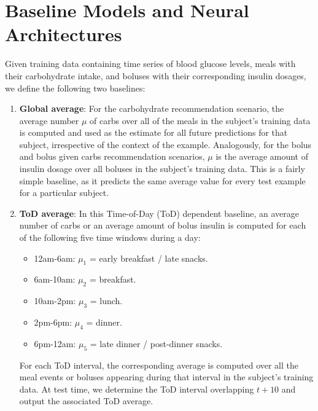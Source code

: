 \documentclass[journal,article,submit,moreauthors,pdftex]{Definitions/mdpi}
\begin{document}


\section{Baseline Models and Neural Architectures}
\label{sec:models}

Given training data containing time series of blood glucose levels, meals with their carbohydrate intake, and boluses with their corresponding insulin dosages, we define the following two baselines:
\begin{enumerate}
    \item {\bf Global average}: 
    For the carbohydrate recommendation scenario, the average number $\mu$ of carbs over all of the meals in the subject's training data is computed and used as the estimate for all future predictions for that subject, irrespective of the context of the example. Analogously, for the bolus and bolus given carbs recommendation scenarios, $\mu$ is the average amount of insulin dosage over all boluses in the subject's training data. This is a fairly simple baseline, as it predicts the same average value for every test example for a particular subject.
    
    \item {\bf ToD average}: In this Time-of-Day (ToD) dependent baseline, an average number of carbs or an average amount of bolus insulin is computed for each of the following five time windows during a day:
	\begin{itemize}
		\item 12am-6am: $\mu_1$ = early breakfast / late snacks.
		\item 6am-10am: $\mu_2$ = breakfast.
		\item 10am-2pm: $\mu_3$ = lunch.
		\item 2pm-6pm: $\mu_4$ = dinner.
		\item 6pm-12am: $\mu_5$ = late dinner / post-dinner snacks.
	\end{itemize}
	For each ToD interval, the corresponding average is computed over all the meal events or boluses appearing during that interval in the subject's training data. At test time, we determine the ToD interval overlapping $t+10$ and output the associated ToD average.
\end{enumerate}
\end{document}
